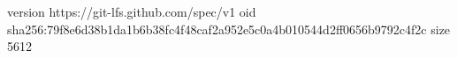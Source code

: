 version https://git-lfs.github.com/spec/v1
oid sha256:79f8e6d38b1da1b6b38fc4f48caf2a952e5c0a4b010544d2ff0656b9792c4f2c
size 5612
